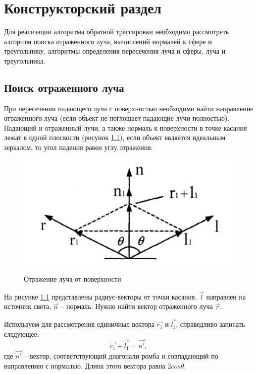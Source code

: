 \chapter{Конструкторский раздел}

Для реализации алгоритма обратной трассировки необходимо рассмотреть алгоритм поиска отраженного луча, вычислений нормалей к сфере и треугольнику, алгоритмы определения пересечения луча и сферы, луча и треугольника.

\section{Поиск отраженного луча}

При пересечении падающего луча с поверхностью необходимо найти направление отраженного луча (если объект не поглощает падающие лучи полностью). Падающий и отраженный лучи, а также нормаль к поверхности в точке касания лежат в одной плоскости (рисунок \ref{rays}), если объект является идеальным зеркалом, то угол падения равен углу отражения.

\begin{figure}[H]
	\begin{center}
		\includegraphics[scale=0.4]{assets/rays.png}
	\end{center}
	\caption{Отражение луча от поверхности}
	\label{rays}
\end{figure}

На рисунке \ref{rays} представлены радиус-векторы от точки касания. $\vec{l}$ направлен на источник света, $\vec{n}$ -- нормаль. Нужно найти вектор отраженного луча $\vec{r}$.

Используем для рассмотрения единичные вектора $\vec{r_1}$ и $\vec{l_1}$, справедливо записать следующее:
\begin{equation}
	\vec{r_1} + \vec{l_1} = \vec{n'},
\end{equation}
где $\vec{n'}$ -- вектор, соответствующий диагонали ромба и совпадающий по направлению с нормалью. Длина этого вектора равна $2cos\theta$.

